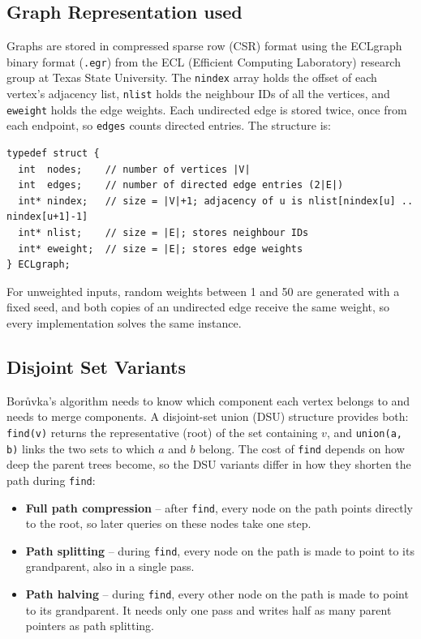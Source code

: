 \documentclass[11pt,a4paper]{article}
\begin{document}
\subsection*{Graph Representation used}
Graphs are stored in compressed sparse row (CSR) format using the ECLgraph binary format (\texttt{.egr}) from the ECL (Efficient Computing Laboratory) research group at Texas State University. The \texttt{nindex} array holds the offset of each vertex's adjacency list, \texttt{nlist} holds the neighbour IDs of all the vertices, and \texttt{eweight} holds the edge weights. Each undirected edge is stored twice, once from each endpoint, so \texttt{edges} counts directed entries. The structure is:

\begin{lstlisting}
typedef struct {
  int  nodes;    // number of vertices |V|
  int  edges;    // number of directed edge entries (2|E|)
  int* nindex;   // size = |V|+1; adjacency of u is nlist[nindex[u] .. nindex[u+1]-1]
  int* nlist;    // size = |E|; stores neighbour IDs
  int* eweight;  // size = |E|; stores edge weights
} ECLgraph;
\end{lstlisting}

For unweighted inputs, random weights between 1 and 50 are generated with a fixed seed, and both copies of an undirected edge receive the same weight, so every implementation solves the same instance.

\subsection*{Disjoint Set Variants}
Bor\r{u}vka's algorithm needs to know which component each vertex belongs to and needs to merge components. A disjoint-set union (DSU) structure provides both: \texttt{find(v)} returns the representative (root) of the set containing $v$, and \texttt{union(a, b)} links the two sets to which $a$ and $b$ belong. The cost of \texttt{find} depends on how deep the parent trees become, so the DSU variants differ in how they shorten the path during \texttt{find}:

\begin{itemize}
  \item \textbf{Full path compression} -- after \texttt{find}, every node on the path points directly to the root, so later queries on these nodes take one step.
  \item \textbf{Path splitting} -- during \texttt{find}, every node on the path is made to point to its grandparent, also in a single pass.
  \item \textbf{Path halving} -- during \texttt{find}, every other node on the path is made to point to its grandparent. It needs only one pass and writes half as many parent pointers as path splitting.
  
\end{itemize}
\end{document}
